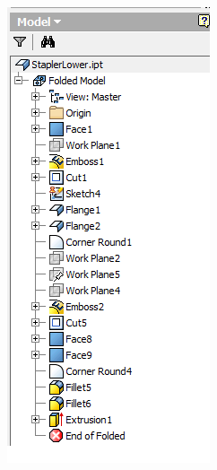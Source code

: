 \begin{minipage}{\linewidth}
\begin{minipage}[c]{0.3\linewidth}
\includegraphics[width=\linewidth,valign=t]{../Common/images/StaplerLower_1_tree}
 \label{fig:results:staplerlowermodeltree}
\end{minipage}
\end{minipage}


